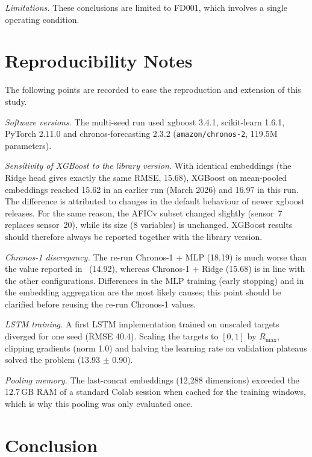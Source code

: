 \documentclass{svproc}
\begin{document}
\textit{Limitations.} These conclusions are limited to FD001, which
involves a single operating condition.

\section{Reproducibility Notes}

The following points are recorded to ease the reproduction and extension of
this study.

\textit{Software versions.} The multi-seed run used xgboost 3.4.1,
scikit-learn 1.6.1, PyTorch 2.11.0 and chronos-forecasting 2.3.2
(\texttt{amazon/chronos-2}, 119.5M parameters).

\textit{Sensitivity of XGBoost to the library version.} With identical
embeddings (the Ridge head gives exactly the same RMSE, 15.68), XGBoost on
mean-pooled embeddings reached 15.62 in an earlier run (March 2026) and
16.97 in this run. The difference is attributed to changes in the default
behaviour of newer xgboost releases. For the same reason, the AFICv subset
changed slightly (sensor~7 replaces sensor~20), while its size (8
variables) is unchanged. XGBoost results should therefore always be
reported together with the library version.

\textit{Chronos-1 discrepancy.} The re-run Chronos-1 + MLP (18.19) is much
worse than the value reported in~\cite{imsa2025} (14.92), whereas
Chronos-1 + Ridge (15.68) is in line with the other configurations.
Differences in the MLP training (early stopping) and in the embedding
aggregation are the most likely causes; this point should be clarified
before reusing the re-run Chronos-1 values.

\textit{LSTM training.} A first LSTM implementation trained on unscaled
targets diverged for one seed (RMSE 40.4). Scaling the targets to $[0,1]$
by $R_\text{max}$, clipping gradients (norm 1.0) and halving the learning
rate on validation plateaus solved the problem (13.93 $\pm$ 0.90).

\textit{Pooling memory.} The last-concat embeddings (12,288 dimensions)
exceeded the 12.7\,GB RAM of a standard Colab session when cached for the
training windows, which is why this pooling was only evaluated once.

\section{Conclusion}
\end{document}

